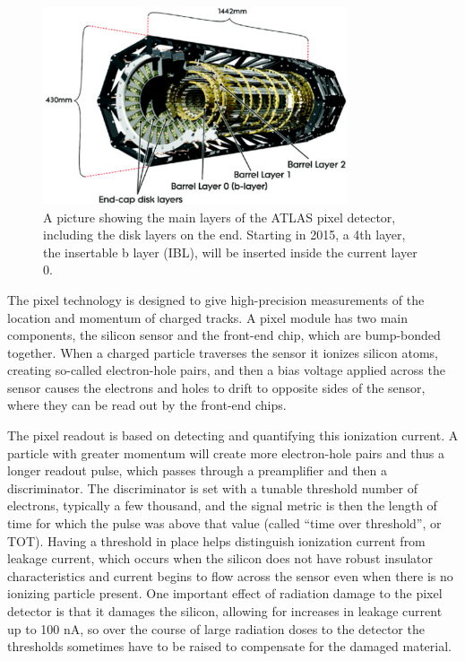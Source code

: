 \begin{figure}
	\includegraphics[width=0.8\textwidth]{ATLASDetector/images/pixel_detector.pdf} 
	\caption{A picture showing the main layers of the ATLAS pixel detector, including the disk layers on the end.  Starting in 2015, a 4th layer, the insertable b layer (IBL), will be inserted inside the current layer 0. 	\label{fig:inner_detector} }
\end{figure}

The pixel technology is designed to give high-precision measurements of the location and momentum of charged tracks.  A pixel module has two main components, the silicon sensor and the front-end chip, which are bump-bonded together.  When a charged particle traverses the sensor it ionizes silicon atoms, creating so-called electron-hole pairs, and then a bias voltage applied across the sensor causes the electrons and holes to drift to opposite sides of the sensor, where they can be read out by the front-end chips.  

The pixel readout is based on detecting and quantifying this ionization current.  A particle with greater momentum will create more electron-hole pairs and thus a longer readout pulse, which passes through a preamplifier and then a discriminator.  The discriminator is set with a tunable threshold number of electrons, typically a few thousand, and the signal metric is then the length of time for which the pulse was above that value (called ``time over threshold'', or TOT).  Having a threshold in place helps distinguish ionization current from leakage current, which occurs when the silicon does not have robust insulator characteristics and current begins to flow across the sensor even when there is no ionizing particle present.  One important effect of radiation damage to the pixel detector is that it damages the silicon, allowing for increases in leakage current up to 100 nA, so over the course of large radiation doses to the detector the thresholds sometimes have to be raised to compensate for the damaged material.  


